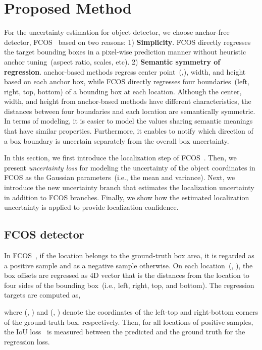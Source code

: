 \documentclass[final]{cvpr}
\begin{document}
\section{Proposed Method}
For the uncertainty estimation for object detector, we choose anchor-free detector, FCOS~\cite{Tian_2019_ICCV} based on two reasons:
1) \textbf{Simplicity}. FCOS directly regresses the target bounding boxes in a pixel-wise prediction manner without heuristic anchor tuning~(aspect ratio, scales, etc).
2) \textbf{Semantic symmetry of regression}. anchor-based methods regress center point~(,), width, and height based on each anchor box, while FCOS directly regresses four boundaries~(left, right, top, bottom) of a bounding box at each location.
Although the center, width, and height from anchor-based methods have different characteristics, the distances between four boundaries and each location are semantically symmetric. 
In terms of modeling, it is easier to model the values sharing semantic meanings that have similar properties. 
Furthermore, it enables to notify which direction of a box boundary is uncertain separately from the overall box uncertainty.


In this section, we first introduce the localization step of FCOS~\cite{Tian_2019_ICCV}.
Then, we present \textit{uncertainty loss} for modeling the uncertainty of the object coordinates in FCOS as the Gaussian parameters~(i.e., the mean and variance).
Next, we introduce the new uncertainty branch that estimates the localization uncertainty in addition to FCOS branches. 
Finally, we show how the estimated localization uncertainty is applied to provide localization confidence.



\subsection{FCOS detector}



In FCOS~\cite{Tian_2019_ICCV}, if the location belongs to the ground-truth box area, it is regarded as a positive sample and as a negative sample otherwise.
On each location~(, ), the box offsets are regressed as 4D vector  that is the distances from the location to four sides of the bounding box~(i.e., left, right, top, and bottom).
The regression targets  are computed as,

where (, ) and (, ) denote the coordinates of the left-top and right-bottom corners of the ground-truth box, respectively. 
Then, for all locations of positive samples, the IoU loss~\cite{yu2016unitbox} is measured between the predicted  and the ground truth  for the regression loss.
\end{document}

